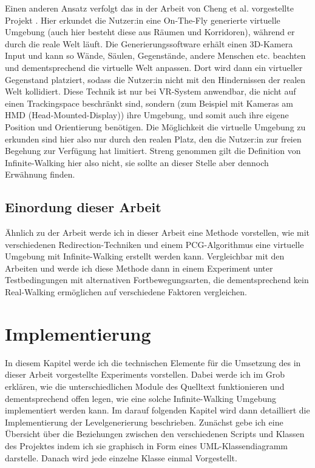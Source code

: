Einen anderen Ansatz verfolgt das in der Arbeit \cite{microsoft} von Cheng et al. vorgestellte Projekt .
Hier erkundet die Nutzer:in eine On-The-Fly generierte virtuelle Umgebung (auch hier besteht diese aus Räumen und Korridoren), während er durch die reale Welt läuft. Die Generierungssoftware erhält einen 3D-Kamera Input und kann so Wände, Säulen, Gegenstände, andere Menschen etc. beachten und dementsprechend die virtuelle Welt anpassen. Dort wird dann ein virtueller Gegenstand platziert, sodass die Nutzer:in nicht mit den Hindernissen der realen Welt kollidiert.
Diese Technik ist nur bei VR-System anwendbar, die nicht auf einen Trackingspace beschränkt sind, sondern (zum Beispiel mit Kameras am HMD (Head-Mounted-Display)) ihre Umgebung, und somit auch ihre eigene Position und Orientierung benötigen. Die Möglichkeit die virtuelle Umgebung zu erkunden sind hier also nur durch den realen Platz, den die Nutzer:in zur freien Begehung zur Verfügung hat limitiert. Streng genommen gilt die Definition von Infinite-Walking hier also nicht, sie sollte an dieser Stelle aber dennoch Erwähnung finden.

\section{Einordung dieser Arbeit}
Ähnlich zu der Arbeit \cite{flexible-spaces} werde ich in dieser Arbeit eine Methode vorstellen, wie mit verschiedenen Redirection-Techniken und einem PCG-Algorithmus eine virtuelle Umgebung mit Infinite-Walking erstellt werden kann.
Vergleichbar mit den Arbeiten \cite{peck-vergleich-2011} und \cite{langbehn-vergleich-2018} werde ich diese Methode dann in einem Experiment unter Testbedingungen mit alternativen Fortbewegungsarten, die dementsprechend kein Real-Walking ermöglichen auf verschiedene Faktoren vergleichen.

\chapter{Implementierung}\label{chapter:implementation}

In diesem Kapitel werde ich die technischen Elemente für die Umsetzung des in dieser Arbeit vorgestellte Experiments vorstellen. Dabei werde ich im Grob erklären, wie die unterschiedlichen Module des Quelltext funktionieren und dementsprechend offen legen, wie eine solche Infinite-Walking Umgebung implementiert werden kann. Im darauf folgenden Kapitel wird dann detailliert die Implementierung der Levelgenerierung beschrieben.
Zunächst gebe ich eine Übersicht über die Beziehungen zwischen den verschiedenen Scripts und Klassen des Projektes indem ich sie graphisch in Form eines UML-Klassendiagramm darstelle. Danach wird jede einzelne Klasse einmal Vorgestellt.

